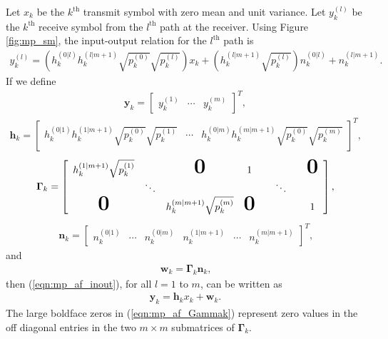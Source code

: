 Let $x_k$ be the $k^{\mbox{th}}$ transmit symbol with zero mean and unit variance.  Let $y_k^{(l)}$  be the $k^{\mbox{th}}$ receive symbol from the $l^{\mbox{th}}$ path at the receiver.  Using Figure \ref{fig:mp_sm}, the input-output relation for the $l^{\mbox{th}}$ path is
\begin{eqnarray}
y_k^{(l)} = \left( h_k^{(0|l)} h_k^{(l|m+1)} \sqrt{p_k^{(0)}} \sqrt{p_k^{(l)}} \right) x_k
+\left( h_k^{(l|m+1)} \sqrt{p_k^{(l)}} \right) n_k^{(0|l)} +  n_k^{(l|m+1)}.
\label{eqn:mp_af_inout}
\end{eqnarray}
If we define
\begin{eqnarray}
\mathbf{y}_k = \left[
\begin{array}{ccc}
y_k^{(1)} &
\cdots &
y_k^{(m)} 
\end{array} \right]^T,
\end{eqnarray}
\begin{eqnarray}
\mathbf{h}_k = \left[
\begin{array}{ccc}
h_k^{(0|1)}h_k^{(1|m+1)} \sqrt{p_k^{(0)}} \sqrt{p_k^{(1)}} & \cdots & h_k^{(0|m)}h_k^{(m|m+1)} \sqrt{p_k^{(0)}} \sqrt{p_k^{(m)}}
\end{array}
\right]^T,
\label{eqn:mp_af_hk}
\end{eqnarray}
\begin{eqnarray}
\mathbf{\Gamma}_k = \left[
\begin{array}{cccccccc}
h_k^{(1|m+1)} \sqrt{p_k^{(1)}}&  & \textbf{\mbox{\huge{0}}} & 1 & & & & \textbf{\mbox{\huge{0}}}  \\
 & \ddots & & & & \ddots & &  \\
\textbf{\mbox{\huge{0}}} &  &h_k^{(m|m+1)} \sqrt{p_k^{(m)}} & \textbf{\mbox{\huge{0}}} & & & & 1 
\end{array}
\right]
\mbox{,}
\label{eqn:mp_af_Gammak}
\end{eqnarray}
\begin{eqnarray}
\mathbf{n}_k = \left[
\begin{array}{cccccc}
n_k^{(0|1)} & \cdots & n_k^{(0|m)} & n_k^{(1|m+1)} & \cdots & n_k^{(m|m+1)}
\end{array} \right]^T\mbox{,}
\label{eqn:mp_af_nk}
\end{eqnarray}
and
\begin{eqnarray}
\mathbf{w}_k = \mathbf{\Gamma}_k \mathbf{n}_k \mbox{,} 
\label{eqn:mp_af_wk}
\end{eqnarray}
then (\ref{eqn:mp_af_inout}), for all $l = 1$ to $m$, can be written as
\begin{eqnarray}
\mathbf{y}_k = \mathbf{h}_k x_k + \mathbf{w}_k \mbox{.}
\label{eqn:mp_af_inout_terse}
\end{eqnarray}
The large boldface zeros in (\ref{eqn:mp_af_Gammak}) represent zero values in the off diagonal entries in the two $m \times m$ submatrices of $\mathbf{\Gamma}_k$.  

